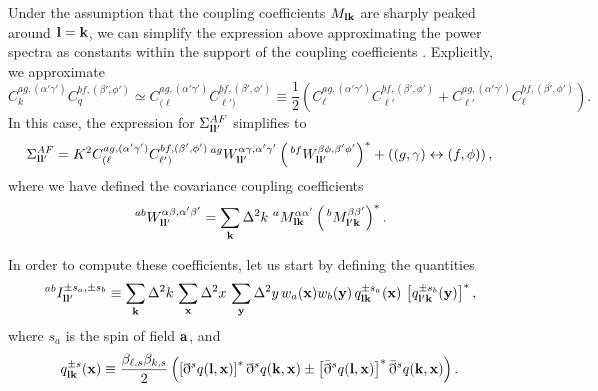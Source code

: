 \documentclass[a4paper,11pt]{article}
\newcommand{\summ}[1]{\sum_{\bf #1}\Delta^2 #1\,}
\begin{document}
      Under the assumption that the coupling coefficients $M_{{\bf l}{\bf k}}$ are sharply peaked around ${\bf l}={\bf k}$, we can simplify the expression above approximating the power spectra as constants within the support of the coupling coefficients \cite{2004MNRAS.349..603E}. Explicitly, we approximate 
      \begin{equation}\nonumber
        C^{ag,(\alpha'\gamma')}_kC^{bf,(\beta',\phi')}_q\simeq C^{ag,(\alpha'\gamma')}_{(\ell}C^{bf,(\beta',\phi')}_{\ell')}\equiv\frac{1}{2}\left(C^{ag,(\alpha'\gamma')}_\ell C^{bf,(\beta',\phi')}_{\ell'}+C^{ag,(\alpha'\gamma')}_{\ell'} C^{bf,(\beta',\phi')}_\ell\right).
      \end{equation}
      In this case, the expression for $\Sigma^{AF}_{{\bf l}{\bf l}'}$ simplifies to
      \begin{align}\label{eq:covar_efstathiou}
        \Sigma^{AF}_{{\bf l}{\bf l}'}=K^2C^{ag,(\alpha'\gamma')}_{(\ell}C^{bf,(\beta',\phi')}_{\ell')}\,^{ag}W^{\alpha\gamma,\alpha'\gamma'}_{{\bf l}{\bf l}'}\left(\,^{bf}W^{\beta\phi,\beta'\phi'}_{{\bf l}{\bf l}'}\right)^*+\left((g,\gamma)\leftrightarrow(f,\phi)\right),
      \end{align}
      where we have defined the covariance coupling coefficients
      \begin{equation}\label{eq:covar_coupling}
        \,^{ab}W^{\alpha\beta,\alpha'\beta'}_{{\bf l}{\bf l}'}=\summ{k}\,^aM^{\alpha\alpha'}_{{\bf l}{\bf k}}\left(\,^bM^{\beta\beta'}_{{\bf l}'{\bf k}}\right)^*.
      \end{equation}

      In order to compute these coefficients, let us start by defining the quantities
      \begin{equation}
        \,^{ab}I^{\pm s_a,\pm s_b}_{{\bf l}{\bf l'}}\equiv\summ{k}\summ{x}\summ{y}w_a({\bf x})w_b({\bf y})\,q^{\pm s_a}_{{\bf l}{\bf k}}({\bf x})\,\left[q^{\pm s_b}_{{\bf l}'{\bf k}}({\bf y})\right]^*,
      \end{equation}
      where $s_a$ is the spin of field ${\bf a}$, and
      \begin{equation}
        q^{\pm s}_{{\bf l}{\bf k}}({\bf x})\equiv \frac{\beta_{\ell,s}\beta_{k,s}}{2}\left(\left[\eth^s q({\bf l},{\bf x})\right]^* \eth^sq({\bf k},{\bf x})\pm\left[\bar{\eth}^sq({\bf l},{\bf x})\right]^*\bar{\eth}^sq({\bf k},{\bf x})\right).
      \end{equation}
\end{document}
